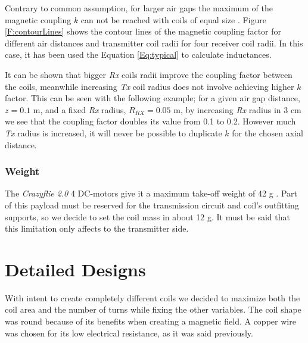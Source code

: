 Contrary to common assumption, for larger air gaps the maximum of the magnetic coupling $k$ can not be reached with coils of equal size \cite{7_Optimized_Magnetic_Design}. Figure \ref{F:contourLines} shows the contour lines of the magnetic coupling factor for different air distances and transmitter coil radii for four receiver coil radii. In this case, it has been used the Equation \ref{Eq:typical} to calculate inductances.

It can be shown that bigger \textit{Rx} coils radii improve the coupling factor between the coils, meanwhile increasing \textit{Tx} coil radius does not involve achieving higher $k$ factor. This can be seen with the following example; for a given air gap distance, $z = 0.1$ m, and a fixed \textit{Rx} radius, $R_{RX} = 0.05$ m, by increasing \textit{Rx} radius in 3 cm we see that the coupling factor doubles its value from 0.1 to 0.2. However much \textit{Tx} radius is increased, it will never be possible to duplicate $k$ for the chosen axial distance.  
		
			\subsubsection{Weight} %
The \textit{Crazyflie 2.0} 4 DC-motors give it a maximum take-off weight of 42 g \cite{crazyflie}. Part of this payload must be reserved for the transmission circuit and coil's outfitting supports, so we decide to set the coil mass in about 12 g. It must be said that this limitation only affects to the transmitter side.





		\section{Detailed Designs}\label{finTFG}
With intent to create completely different coils we decided to maximize both the coil area and the number of turns while fixing the other variables. The coil shape was round because of its benefits when creating a magnetic field. A copper wire was chosen for its low electrical resistance, as it was said previously. 


